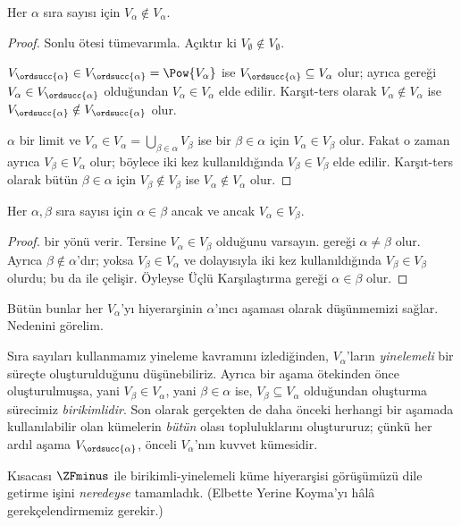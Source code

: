 \documentclass[../../../include/open-logic-section]{subfiles}
\begin{document}
\begin{lem}
Her $\alpha$ sıra sayısı için $V_\alpha\notin V_\alpha$.
\end{lem}

\begin{proof}
Sonlu ötesi tümevarımla. Açıktır ki
$V_\emptyset\notin V_\emptyset$.

$V_{\ordsucc{\alpha}}\in V_{\ordsucc{\alpha}}=\Pow{V_\alpha}$ ise
$V_{\ordsucc{\alpha}}\subseteq V_\alpha$ olur; ayrıca
 gereği
$V_\alpha\in V_{\ordsucc{\alpha}}$ olduğundan $V_\alpha\in V_\alpha$
elde edilir. Karşıt-ters olarak $V_\alpha\notin V_\alpha$ ise
$V_{\ordsucc{\alpha}}\notin V_{\ordsucc{\alpha}}$ olur.

$\alpha$ bir limit ve
$V_\alpha\in V_\alpha=\bigcup_{\beta\in\alpha}V_\beta$ ise bir
$\beta\in\alpha$ için $V_\alpha\in V_\beta$ olur. Fakat o zaman ayrıca
$V_\beta\in V_\alpha$ olur; böylece
 iki kez kullanıldığında
$V_\beta\in V_\beta$ elde edilir. Karşıt-ters olarak bütün
$\beta\in\alpha$ için $V_\beta\notin V_\beta$ ise
$V_\alpha\notin V_\alpha$ olur.
\end{proof}

\begin{cor}
Her $\alpha,\beta$ sıra sayısı için $\alpha\in\beta$ ancak ve ancak
$V_\alpha\in V_\beta$.
\end{cor}

\begin{proof}
 bir yönü verir. Tersine
$V_\alpha\in V_\beta$ olduğunu varsayın.  gereği
$\alpha\neq\beta$ olur. Ayrıca $\beta\notin\alpha$'dır; yoksa
$V_\beta\in V_\alpha$ ve dolayısıyla
 iki kez kullanıldığında
$V_\beta\in V_\beta$ olurdu; bu da  ile çelişir.
Öyleyse Üçlü Karşılaştırma gereği $\alpha\in\beta$ olur.
\end{proof}
\noindent
Bütün bunlar her $V_\alpha$'yı hiyerarşinin $\alpha$'ıncı aşaması olarak
düşünmemizi sağlar. Nedenini görelim.

Sıra sayıları kullanmamız yineleme kavramını izlediğinden, $V_\alpha$'ların
\emph{yinelemeli} bir süreçte oluşturulduğunu düşünebiliriz. Ayrıca bir
aşama ötekinden önce oluşturulmuşsa, yani $V_\beta\in V_\alpha$, yani
$\beta\in\alpha$ ise, $V_\beta\subseteq V_\alpha$ olduğundan oluşturma
sürecimiz \emph{birikimlidir}. Son olarak gerçekten de daha önceki herhangi
bir aşamada kullanılabilir olan kümelerin \emph{bütün} olası topluluklarını
oluştururuz; çünkü her ardıl aşama $V_{\ordsucc{\alpha}}$, önceli
$V_\alpha$'nın kuvvet kümesidir.

Kısacası $\ZFminus$ ile birikimli-yinelemeli küme hiyerarşisi görüşümüzü
dile getirme işini \emph{neredeyse} tamamladık. (Elbette Yerine Koyma'yı
hâlâ gerekçelendirmemiz gerekir.)
\end{document}
